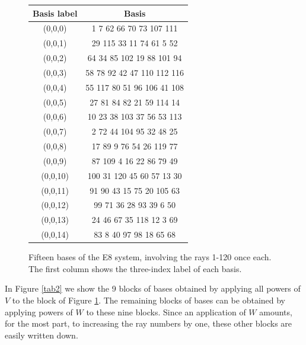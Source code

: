 \begin{figure}[ht]
\centering %
\begin{tabular}{|c | c |} %
\hline %
Basis label & Basis  \\
\hline
(0,0,0) &  1 7  62  66  70  73 107 111 \\
(0,0,1) & 29 115 33	11	74	61	5	52 \\
(0,0,2) & 64 34	85	102	19	88	101	94 \\
(0,0,3) & 58 78	92	42	47	110	112	116\\
(0,0,4) & 55 117	80	51	96	106	41	108\\
(0,0,5) & 27 81	84	82	21	59	114	14\\
(0,0,6) & 10 23	38	103	37	56	53	113\\
(0,0,7) & 2	72	44	104	95	32	48	25\\
(0,0,8) & 17 89	9	76	54	26	119	77\\
(0,0,9) & 87 109	4	16	22	86	79	49\\
(0,0,10) & 100 31	120	45	60	57	13	30\\
(0,0,11) & 91	90	43	15	75	20	105	63\\
(0,0,12) & 99	71	36	28	93	39	6	50\\
(0,0,13) & 24	46	67	35	118	12	3	69\\
(0,0,14) & 83	8	40	97	98	18	65	68\\
\hline
\end{tabular}
\caption{Fifteen bases of the E8 system, involving the rays 1-120 once each. The first column shows the three-index label of each basis.}
\label{tab1} %
\end{figure}

In Figure \ref{tab2} we show the 9 blocks of bases obtained by applying all powers of $V$ to the block of Figure \ref{tab1}. The remaining blocks of bases can be obtained by applying powers of $W$ to these nine blocks. Since an application of $W$ amounts, for the most part, to increasing the ray numbers by one, these other blocks are easily written down.\\

